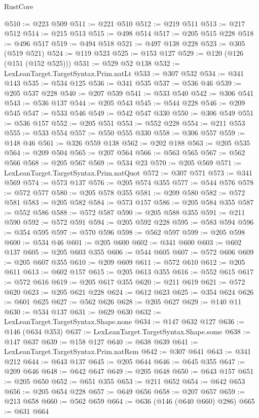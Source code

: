 \begin{lexlean}{RustCore}
\begin{coremodule}
@510 := @223 @509
@511 := @221 @510
@512 := @219 @511
@513 := @217 @512
@514 := @215 @513
@515 := @498 @514
@517 := @205 @515 @228
@518 := @496 @517
@519 := @494 @518
@521 := @497 @138 @228
@523 := @305 (@519 @521)
@524 := @119 @523
@525 := @153 @127
@529 := @120 (@126 (@151 (@152 @525)))
@531 := @529 @52 @138
@532 := LexLeanTarget.TargetSyntax.Prim.natLt
@533 := @307 @532
@534 := @341 @143
@535 := @534 @125
@536 := @341 @535
@537 := @536 @46
@539 := @205 @537 @228
@540 := @207 @539
@541 := @533 @540
@542 := @306 @541
@543 := @536 @137
@544 := @205 @543
@545 := @544 @228
@546 := @209 @545
@547 := @533 @546
@549 := @542 @547 @330
@550 := @306 @549
@551 := @536 @157
@552 := @205 @551
@553 := @552 @228
@554 := @211 @553
@555 := @533 @554
@557 := @550 @555 @330
@558 := @306 @557
@559 := @148 @46
@561 := @326 @559 @138
@562 := @202 @188
@563 := @205 @535
@564 := @209 @504
@565 := @207 @564
@566 := @563 @565
@567 := @562 @566
@568 := @205 @567
@569 := @534 @23
@570 := @205 @569
@571 := LexLeanTarget.TargetSyntax.Prim.natQuot
@572 := @307 @571
@573 := @341 @569
@574 := @573 @137
@576 := @205 @574 @355
@577 := @544 @576
@578 := @572 @577
@580 := @205 @578 @355
@581 := @209 @580
@582 := @572 @581
@583 := @205 @582
@584 := @573 @157
@586 := @205 @584 @355
@587 := @552 @586
@588 := @572 @587
@590 := @205 @588 @355
@591 := @211 @590
@592 := @572 @591
@594 := @205 @592 @228
@595 := @583 @594
@596 := @354 @595
@597 := @570 @596
@598 := @562 @597
@599 := @205 @598
@600 := @534 @46
@601 := @205 @600
@602 := @341 @600
@603 := @602 @137
@605 := @205 @603 @355
@606 := @544 @605
@607 := @572 @606
@609 := @205 @607 @355
@610 := @209 @609
@611 := @572 @610
@612 := @205 @611
@613 := @602 @157
@615 := @205 @613 @355
@616 := @552 @615
@617 := @572 @616
@619 := @205 @617 @355
@620 := @211 @619
@621 := @572 @620
@623 := @205 @621 @228
@624 := @612 @623
@625 := @354 @624
@626 := @601 @625
@627 := @562 @626
@628 := @205 @627
@629 := @140 @11
@630 := @534 @137
@631 := @629 @630
@632 := LexLeanTarget.TargetSyntax.Shape.none
@634 := @147 @632 @127
@636 := @146 (@634 @353)
@637 := LexLeanTarget.TargetSyntax.Shape.some
@638 := @147 @637
@639 := @158 @127
@640 := @638 @639
@641 := LexLeanTarget.TargetSyntax.Prim.natRem
@642 := @307 @641
@643 := @341 @212
@644 := @643 @137
@645 := @205 @644
@646 := @645 @355
@647 := @209 @646
@648 := @642 @647
@649 := @205 @648
@650 := @643 @157
@651 := @205 @650
@652 := @651 @355
@653 := @211 @652
@654 := @642 @653
@656 := @205 @654 @228
@657 := @649 @656
@658 := @207 @657
@659 := @213 @658
@660 := @562 @659
@664 := @636 (@146 (@640 @660) @286)
@665 := @631 @664

\end{coremodule}
\end{lexlean}
